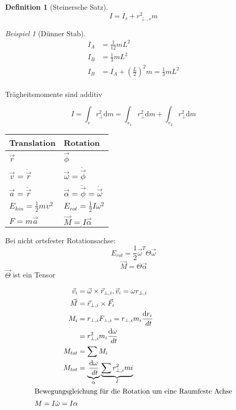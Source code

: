 \documentclass[a4paper]{scrartcl}
\renewcommand{\d}{\mathrm{d}}
\renewcommand{\v}[1]{\vec{#1}}
\newcommand{\dd}[2]{\frac{\d #1}{\ d#2}}
\theoremstyle{definition}
\newtheorem{defn}{Definition}
\theoremstyle{plain}
\theoremstyle{plain}
\theoremstyle{remark}
\theoremstyle{remark}
\theoremstyle{remark}
\newtheorem{ex}{Beispiel}
\begin{document}
\begin{defn}[Steinersche Satz]
\[I = I_s + r_{\perp,s}^2 m\]
\end{defn}
\begin{ex}[Dünner Stab]
\begin{align*}
I_A &= \frac{1}{12} m L^2 \\
I_B  &= \frac{1}{3} m L^2 \\
I_B &= I_A + (\frac{L}{2})^2 m = \frac{1}{3} m L^2 \\
\end{align*}
\end{ex}

Trägheitsmomente sind additiv

\[I = \int_v r_{\perp}^2 \d m = \int_{v_1} r_{\perp}^2 \d m + \int_{v_2} r_{\perp}^2 \d m\]

\begin{center}
\begin{tabular}{ll}
Translation & Rotation\\
\hline
$\v r$ & $\v \phi$\\
$\v v = \dot{\v r}$ & $\v \omega = \dot{\v \phi}$\\
$\v a = \ddot{\v r}$ & $\v \alpha = \ddot{\v \phi} = \dot{\v \omega}$\\
$\displaystyle E_{kin} = \frac{1}{2} m v^2$ & $\displaystyle E_{rot} = \frac{1}{2} I \omega^2$\\
$F = m\v a$ & $\v M = I \v \alpha$\\
\end{tabular}
\end{center}

Bei nicht ortsfester Rotationsachse:
\[E_{rot} = \frac{1}{2} \v \omega^{T} \Theta \v \omega\]
\[\v M = \Theta \v \alpha\]
$\v \Theta$ ist ein Tensor

\begin{align*}
\v v_i &= \v \omega \times \v r_{\perp, i}, \v v_i = \omega r_{\perp,i} \\
\v M &= \v r_{\perp,i} \times \v F_i \\
M_i &= r_{\perp, i} F_{\perp, i} =  r_{\perp, i} m_i \dd{r_i}{t} \\
&= r_{\perp,i}^2 m_i \dd{\omega}{t} \\
M_{tot} &= \sum M_i \\
M_{tot} &= \underbrace{\dd{\omega}{t}}_{\alpha} \underbrace{\sum r_{\perp,i}^2 mi}_{I} \\
\intertext{Bewegungsgleichung für die Rotation um eine Raumfeste Achse}
M = I \dot{\omega} = I \alpha
\end{align*}
\end{document}
